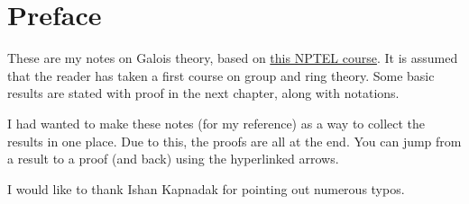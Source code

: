 \chapter*{Preface}
These are my notes on Galois theory, based on \href{https://nptel.ac.in/courses/111101001}{this NPTEL course}. It is assumed that the reader has taken a first course on group and ring theory. Some basic results are stated with proof in the next chapter, along with notations. 

I had wanted to make these notes (for my reference) as a way to collect the results in one place. Due to this, the proofs are all at the end. You can jump from a result to a proof (and back) using the hyperlinked arrows.

I would like to thank Ishan Kapnadak for pointing out numerous typos.